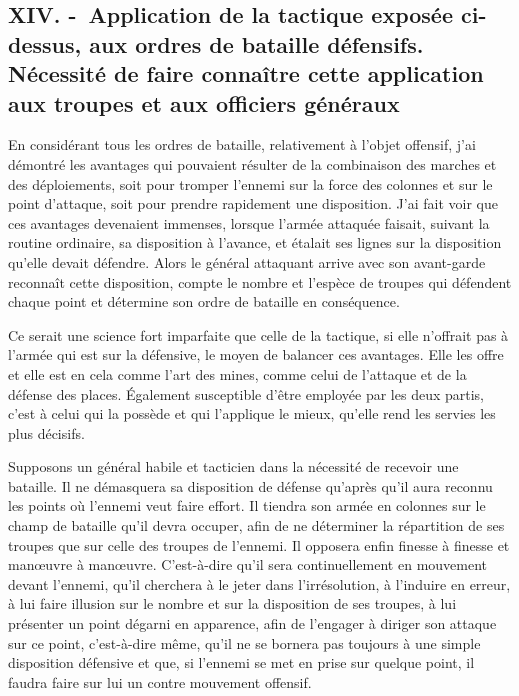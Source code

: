 \documentclass[french,twoside]{book} %
\begin{document}
\subsection[{XIV. - Application de la tactique exposée ci-dessus, aux ordres de bataille défensifs. Nécessité de faire connaître cette application aux troupes et aux officiers généraux}]{XIV. - Application de la tactique exposée ci-dessus, aux ordres de bataille défensifs. Nécessité de faire connaître cette application aux troupes et aux officiers généraux}
\noindent En considérant tous les ordres de bataille, relativement à l’objet offensif, j’ai démontré les avantages qui pouvaient résulter de la combinaison des marches et des déploiements, soit pour tromper l’ennemi sur la force des colonnes et sur le point d’attaque, soit pour prendre rapidement une disposition. J’ai fait voir que ces avantages devenaient immenses, lorsque l’armée attaquée faisait, suivant la routine ordinaire, sa disposition à l’avance, et étalait ses lignes sur la disposition qu’elle devait défendre. Alors le général attaquant arrive avec son avant-garde reconnaît cette disposition, compte le nombre et l’espèce de troupes qui défendent chaque point et détermine son ordre de bataille en conséquence.\par
Ce serait une science fort imparfaite que celle de la tactique, si elle n’offrait pas à l’armée qui est sur la défensive, le moyen de balancer ces avantages. Elle les offre et elle est en cela comme l’art des mines, comme celui de l’attaque et de la défense des places. Également susceptible d’être employée par les deux partis, c’est à celui qui la possède et qui l’applique le mieux, qu’elle rend les servies les plus décisifs.\par
Supposons un général habile et tacticien dans la nécessité de recevoir une bataille. Il ne démasquera sa disposition de défense qu’après qu’il aura reconnu les points où l’ennemi veut faire effort. Il tiendra son armée en colonnes sur le champ de bataille qu’il devra occuper, afin de ne déterminer la répartition de ses troupes que sur celle des troupes de l’ennemi. Il opposera enfin finesse à finesse et manœuvre à manœuvre. C’est-à-dire qu’il sera continuellement en mouvement devant l’ennemi, qu’il cherchera à le jeter dans l’irrésolution, à l’induire en erreur, à lui faire illusion sur le nombre et sur la disposition de ses troupes, à lui présenter un point dégarni en apparence, afin de l’engager à diriger son attaque sur ce point, c’est-à-dire même, qu’il ne se bornera pas toujours à une simple disposition défensive et que, si l’ennemi se met en prise sur quelque point, il faudra faire sur lui un contre mouvement offensif.\par
\end{document}
